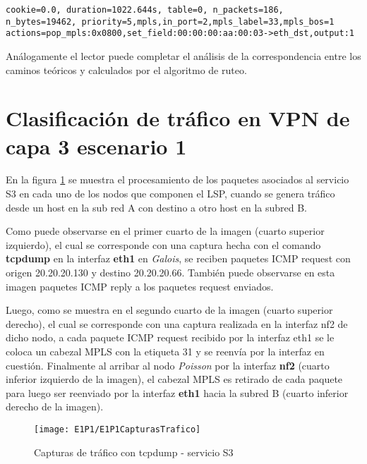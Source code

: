 \begin{center}
\texttt{cookie=0.0, duration=1022.644s, table=0, n\_packets=186, \\
n\_bytes=19462, priority=5,mpls,in\_port=2,mpls\_label=33,mpls\_bos=1 \\
actions=pop\_mpls:0x0800,set\_field:00:00:00:aa:00:03->eth\_dst,output:1 }
\end{center}

Análogamente el lector puede completar el análisis de la correspondencia entre los caminos te\'oricos y calculados por el algoritmo de ruteo.

\section{Clasificación de tr\'afico en VPN de capa 3 escenario 1}
\label{appendix6.2}

En la figura \ref{fig:LabE1P1CapsTraf} se muestra el procesamiento de los paquetes asociados al servicio S3 en cada uno de los nodos que componen el LSP, cuando se genera tr\'afico desde un host en la sub red A con destino a otro host en la subred B.

Como puede observarse en el primer cuarto de la imagen (cuarto superior izquierdo), el cual se corresponde con una captura hecha con el comando \textbf{tcpdump} en la interfaz \textbf{eth1} en \textit{Galois}, se reciben paquetes ICMP request con origen 20.20.20.130 y destino 20.20.20.66. Tambi\'en puede observarse en esta imagen paquetes ICMP reply a los paquetes request enviados.

Luego, como se muestra en el segundo cuarto de la imagen (cuarto superior derecho), el cual se corresponde con una captura realizada en la interfaz nf2 de dicho nodo, a cada paquete ICMP request recibido por la interfaz eth1 se le coloca un cabezal MPLS con la etiqueta 31 y se reenvía por la interfaz en cuestión. Finalmente al arribar al nodo \textit{Poisson} por la interfaz \textbf{nf2} (cuarto inferior izquierdo de la imagen), el cabezal MPLS es retirado de cada paquete para luego ser reenviado por la interfaz \textbf{eth1} hacia la subred B (cuarto inferior derecho de la imagen).\\

\newpage
\begin{figure}[ht!] 
\centering    
\texttt{[image: E1P1/E1P1CapturasTrafico]}
\caption[Capturas de tr\'afico con tcpdump - servicio S3]{Capturas de tr\'afico con tcpdump - servicio S3}
\label{fig:LabE1P1CapsTraf}
\end{figure}

